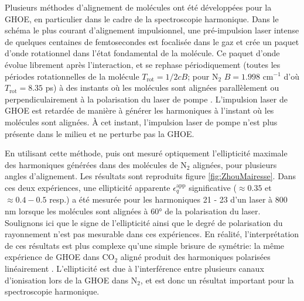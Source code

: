 Plusieurs méthodes d'alignement de molécules ont été développées pour la GHOE, en particulier dans le cadre de la spectroscopie harmonique. Dans le schéma le plus courant d'alignement impulsionnel, une pré-impulsion laser intense de quelques centaines de femtosecondes est focalisée dans le gaz et crée un paquet d'onde rotationnel dans l'état fondamental de la molécule. Ce paquet d'onde évolue librement après l'interaction, et se rephase périodiquement (toutes les périodes rotationnelles de la molécule $T_{\text{rot}} = 1/2cB$; pour N$_2$ $B = 1.998$ cm$^{-1}$ d'où $T_{\text{rot}} = 8.35$ ps) à des instants où les molécules sont alignées parallèlement ou perpendiculairement à la polarisation du laser de pompe . L'impulsion laser de GHOE est retardée de manière à générer les harmoniques à l'instant où les molécules sont alignées. \`{A} cet instant, l'impulsion laser de pompe n'est plus présente dans le milieu et ne perturbe pas la GHOE.

En utilisant cette méthode,  puis  ont mesuré optiquement l'ellipticité maximale des harmoniques générées dans des molécules de N$_2$ alignées, pour plusieurs angles d'alignement. Les résultats sont reproduits figure \ref{fig:ZhouMairesse}. Dans ces deux expériences, une ellipticité apparente $\epsilon_q^{\text{app}}$ significative ($\approx 0.35$ et $\approx 0.4 - 0.5$ resp.) a été mesurée pour les harmoniques 21 - 23 d'un laser à 800 nm lorsque les molécules sont alignées à 60° de la polarisation du laser. Soulignons ici que le signe de l'ellipticité ainsi que le degré de polarisation du rayonnement n'est pas mesurable dans ces expériences. En réalité, l'interprétation de ces résultats est plus complexe qu'une simple brisure de symétrie: la même expérience de GHOE dans CO$_2$ aligné produit des harmoniques polarisées linéairement . L'ellipticité est due à l'interférence entre plusieurs canaux d'ionisation lors de la GHOE dans N$_2$, et est donc un résultat important pour la spectroscopie harmonique.

